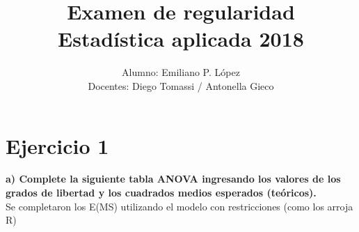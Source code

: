 \documentclass[11pt]{article}
\title{Examen de regularidad \\ Estadística aplicada 2018}
\author{Alumno: Emiliano P. López \\ Docentes: Diego Tomassi / Antonella Gieco}
\begin{document}
    
    
    \maketitle
    
    

    


    \hypertarget{ejercicio-1}{%
\section*{Ejercicio 1}\label{ejercicio-1}}

\textbf{a) Complete la siguiente tabla ANOVA ingresando los valores de
los grados de libertad y los cuadrados medios esperados (teóricos).}\\

Se completaron los E(MS) utilizando el modelo con restricciones (como
los arroja R)
\end{document}
